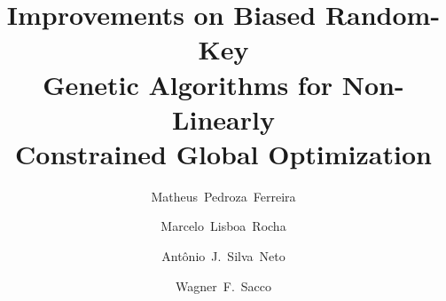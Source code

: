 \begin{frontmatter}

\title{Improvements on Biased Random-Key \\ Genetic Algorithms for Non-Linearly \\ Constrained Global Optimization}





\author[label1]{Matheus~Pedroza~Ferreira}

\author[label1]{Marcelo~Lisboa~Rocha}

\author[label2]{Ant\^onio~J.~Silva~Neto}

\author[label3]{Wagner~F.~Sacco}



\address[label1]{Departamento de Ci\^encia da Computa\c{c}\~ao, Universidade Federal do Tocantins, Quadra 109 Norte, Avenida NS-15, ALCNO-14, Palmas, Tocantins, Brazil}

\address[label2]{Departamento de Engenharia Mec\^anica e Energia, Instituto Polit\'ecnico, Universidade do Estado do Rio de Janeiro IPRJ/UERJ, RJ, Brazil}

\address[label3]{Instituto de Engenharia e Geociências, Universidade Federal do Oeste do Pará, PA, Brazil}













\iffalse





\end{frontmatter}
